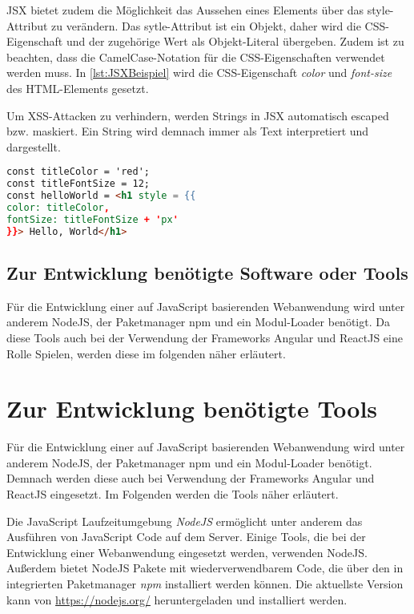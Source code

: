 JSX bietet zudem die Möglichkeit das Aussehen eines Elements über das style-Attribut zu verändern. Das sytle-Attribut ist ein Objekt, daher wird die CSS-Eigenschaft und der zugehörige Wert als Objekt-Literal übergeben. Zudem ist zu beachten, dass die CamelCase-Notation für die CSS-Eigenschaften verwendet werden muss. In \autoref{lst:JSXBeispiel} wird die CSS-Eigenschaft \textit{color} und \textit{font-size} des HTML-Elements gesetzt.

Um XSS-Attacken zu verhindern, werden Strings in JSX automatisch escaped bzw. maskiert. Ein String wird demnach immer als Text interpretiert und dargestellt.\autocites[vgl.][59\psqq]{Zeigermann.2016}[vgl.][65\psqq]{Stefanov.2017} 

\begin{lstlisting}[caption=Beispiel für die Verwendung von JSX, label=lst:JSXBeispiel, language=HTML]
const titleColor = 'red';
const titleFontSize = 12;
const helloWorld = <h1 style = {{
color: titleColor,
fontSize: titleFontSize + 'px'
}}> Hello, World</h1>
\end{lstlisting}



\subsection{Zur Entwicklung benötigte Software oder Tools}
Für die Entwicklung einer auf JavaScript basierenden Webanwendung wird unter anderem NodeJS, der Paketmanager npm und ein Modul-Loader benötigt. Da diese Tools auch bei der Verwendung der Frameworks Angular und ReactJS eine Rolle Spielen, werden diese  im folgenden näher erläutert.
\section{Zur Entwicklung benötigte Tools}
Für die Entwicklung einer auf JavaScript basierenden Webanwendung wird unter anderem NodeJS, der Paketmanager npm und ein Modul-Loader benötigt. Demnach werden diese auch bei Verwendung der Frameworks Angular und ReactJS eingesetzt. Im Folgenden werden die Tools näher erläutert.

\label{NodeJS}
Die JavaScript Laufzeitumgebung \textit{NodeJS} ermöglicht unter anderem das Ausführen von JavaScript Code auf dem Server. Einige Tools, die bei der Entwicklung einer Webanwendung eingesetzt werden, verwenden NodeJS. Außerdem bietet NodeJS Pakete mit wiederverwendbarem Code, die über den in integrierten Paketmanager \textit{npm} installiert werden können. Die aktuellste Version kann von \url{https://nodejs.org/} heruntergeladen und installiert werden.  \autocites[vgl.][1\psqq]{Steyer.2017}[vgl.][7\psqq]{Freeman.2018}[vgl.][6\psqq]{Woiwode.2018} 

